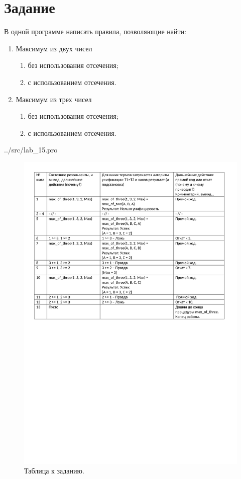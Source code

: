 \section*{Задание}
В одной программе написать правила, позволяющие найти:
\begin{enumerate}
	\item Максимум из двух чисел
	\begin{enumerate}
		\item без использования отсечения;
		\item с использованием отсечения.
	\end{enumerate}
	\item Максимум из трех чисел
	\begin{enumerate}
		\item без использования отсечения;
		\item с использованием отсечения.
	\end{enumerate}
\end{enumerate}

\begin{lstinputlisting}[label=third,caption=Решение задания №1, language=prolog, firstline=1, lastline=47]{../src/lab_15.pro}
\end{lstinputlisting}

\begin{figure}[H]
	\caption{Таблица к заданию.}
	\begin{center}
		\includegraphics[scale=0.85]{img/15.1.pdf}
	\end{center}
	
\end{figure}


